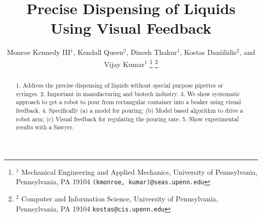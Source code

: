 

\title{\LARGE \bf Precise Dispensing of Liquids  Using  Visual Feedback
}

\author{Monroe Kennedy III$^{1}$, Kendall Queen$^{2}$, Dinesh Thakur$^{1}$, Kostas Daniilidis$^{2}$, and Vijay Kumar$^{1}$%
\thanks{$^{1}$ Mechanical Engineering and Applied Mechanics,
        University of Pennsylvania, Pennsylvania, PA 19104
        {\tt\small (kmonroe, kumar)@seas.upenn.edu}}%
\thanks{$^{2}$ Computer and Information Science,
        University of Pennsylvania, Pennsylvania, PA 19104
        {\tt\small kostas@cis.upenn.edu}}%
}






\maketitle
\thispagestyle{empty}
\pagestyle{empty}


\begin{abstract}
1. Address the precise dispensing of liquids without special purpose pipettes or syringes. 
2. Important in manufacturing and biotech industry.
3. We show systematic approach to get a robot to pour from rectangular container into a beaker using visual feedback. 
4. Specifically (a) a model for pouring; (b) Model based algorithm to drive a robot arm; (c) Visual feedback for regulating the pouring rate.
5. Show experimental results with a Sawyer.
\end{abstract}


